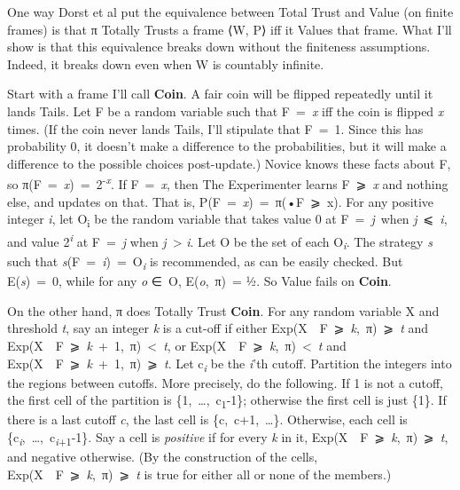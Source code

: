\documentclass[
  12pt,
  letterpaper,
  DIV=11,
  numbers=noendperiod]{scrartcl}
\begin{document}
One way Dorst et al put the equivalence between Total Trust and Value
(on finite frames) is that π Totally Trusts a frame ⟨W, P⟩ iff it Values
that frame. What I'll show is that this equivalence breaks down without
the finiteness assumptions. Indeed, it breaks down even when W is
countably infinite.

Start with a frame I'll call \textbf{Coin}. A fair coin will be flipped
repeatedly until it lands Tails. Let F be a random variable such that
F~=~\emph{x} iff the coin is flipped \emph{x} times. (If the coin never
lands Tails, I'll stipulate that F~=~1. Since this has probability 0, it
doesn't make a difference to the probabilities, but it will make a
difference to the possible choices post-update.) Novice knows these
facts about F, so π(F~=~\emph{x})~=~2\textsuperscript{-\emph{x}}. If
F~=~\emph{x}, then The Experimenter learns F~⩾~\emph{x} and nothing
else, and updates on that. That is,
P(F~=~\emph{x})~=~π(•\textbar F~⩾~x). For any positive integer \emph{i},
let O\textsubscript{i} be the random variable that takes value 0 at
F~=~\emph{j}~when \emph{j}~⩽~\emph{i}, and value
2\textsuperscript{\emph{i}} at F~=~\emph{j} when \emph{j}~\textgreater{}
\emph{i}. Let O be the set of each O\textsubscript{\emph{i}}. The
strategy \emph{s} such that
\emph{s}(F~=~\emph{i})~=~O\textsubscript{\emph{i}} is recommended, as
can be easily checked. But E(\emph{s})~=~0, while for any \emph{o} ∈~O,
E(\emph{o},~π)~= ½. So Value fails on \textbf{Coin}.

On the other hand, π does Totally Trust \textbf{Coin}. For any random
variable X and threshold \emph{t}, say an integer \emph{k} is a cut-off
if either Exp(X~\textbar~F~⩾~\emph{k},~π)~⩾~\emph{t} and
Exp(X~\textbar~F~⩾~\emph{k}~+~1,~π)~\textless~\emph{t}, or
Exp(X~\textbar~F~⩾~\emph{k},~π)~\textless~\emph{t} and
Exp(X~\textbar~F~⩾~\emph{k}~+~1,~π)~⩾~\emph{t}. Let
c\textsubscript{\emph{i}} be the \emph{i}'th cutoff. Partition the
integers into the regions between cutoffs. More precisely, do the
following. If 1 is not a cutoff, the first cell of the partition is
\{1,~\ldots,~c\textsubscript{1}-1\}; otherwise the first cell is just
\{1\}. If there is a last cutoff \emph{c}, the last cell is
\{c,~c+1,~\ldots\}. Otherwise, each cell is
\{c\textsubscript{\emph{i}},~\ldots,~c\textsubscript{\emph{i}+1}-1\}.
Say a cell is \emph{positive} if for every \emph{k} in it,
Exp(X~\textbar~F~⩾~\emph{k},~π)~⩾~\emph{t}, and negative otherwise. (By
the construction of the cells,
Exp(X~\textbar~F~⩾~\emph{k},~π)~⩾~\emph{t} is true for either all or
none of the members.)
\end{document}
